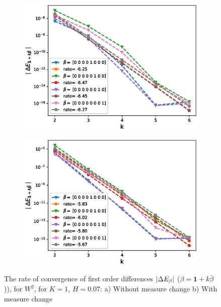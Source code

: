 \documentclass[11pt]{article}
\begin{document}
\begin{figure}[h!]
	\centering
	\begin{subfigure}{.4\textwidth}
		\centering
		\includegraphics[width=1\linewidth]{./figures/rBergomi_mixed_error_rates/without_change_measure/N_4/H_007/first_difference_rbergomi_4steps_H_007_K_1_totally_hierarch_with_rate_W2}
		\caption{}
		\label{fig:sub3}
	\end{subfigure}%
	\begin{subfigure}{.4\textwidth}
		\centering
		\includegraphics[width=1\linewidth]{./figures/rBergomi_mixed_error_rates/partial_change_measure/N_4/H_007/first_difference_rbergomi_4steps_H_007_K_1_totally_hierarch_with_rate_W2_change_measure_part_spec}
		\caption{}
		\label{fig:sub4}
	\end{subfigure}
	
	\caption{The rate of convergence of  first order differences $\left\lvert\Delta E_{\beta}\right\rvert$ ($\beta=\mathbf{1}+k \bar{\beta}$)), for $W^2$, for $K=1$, $H=0.07$: a) Without measure change b) With measure change}
	\label{fig:first_diff_comp_K_1_H_007_W_2}
\end{figure}
\end{document}
